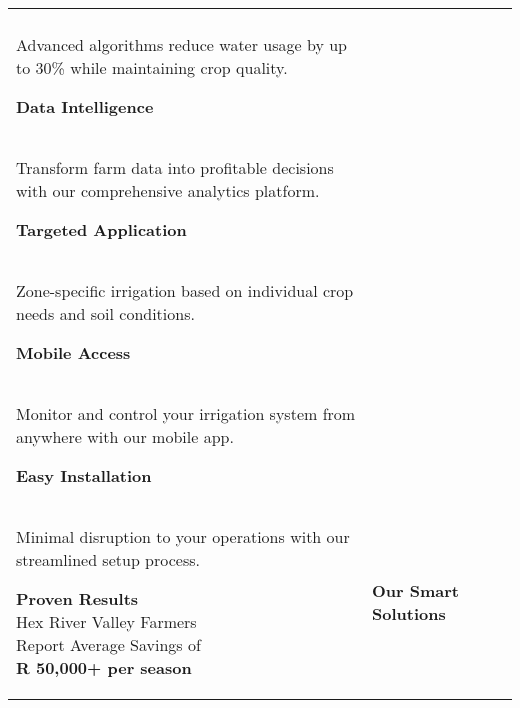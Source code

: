 \documentclass[a4paper,landscape]{article}
\begin{document}
\begin{tabular}{|p{8.5cm}|p{8.5cm}|p{8.5cm}|}
\begin{minipage}[t]{8cm}
\vspace{0.4cm}

{\large \textcolor{wetgreen}{\textbf{Water Conservation}}}\\
\small
Advanced algorithms reduce water usage by up to 30\% while maintaining crop quality.

\vspace{0.4cm}

{\large \textcolor{wetgreen}{\textbf{Data Intelligence}}}\\
\small
Transform farm data into profitable decisions with our comprehensive analytics platform.

\vspace{0.4cm}

{\large \textcolor{wetgreen}{\textbf{Targeted Application}}}\\
\small
Zone-specific irrigation based on individual crop needs and soil conditions.

\vspace{0.4cm}

{\large \textcolor{wetgreen}{\textbf{Mobile Access}}}\\
\small
Monitor and control your irrigation system from anywhere with our mobile app.

\vspace{0.4cm}

{\large \textcolor{wetgreen}{\textbf{Easy Installation}}}\\
\small
Minimal disruption to your operations with our streamlined setup process.

\vspace{1cm}

\colorbox{wetlightblue}{\parbox{7cm}{
\centering
\textcolor{wetblue}{\textbf{Proven Results}}\\[0.2cm]
\textcolor{wetgreen}{Hex River Valley Farmers}\\
\textcolor{wetblue}{Report Average Savings of}\\
\textcolor{wetgreen}{\textbf{R 50,000+ per season}}
}}

\end{minipage}

&

\begin{minipage}[t]{8cm}
\vspace{0.5cm}

{\Large \textcolor{wetblue}{\textbf{Our Smart Solutions}}}

\vspace{0.5cm}


\end{minipage}
\end{tabular}
\end{document}
